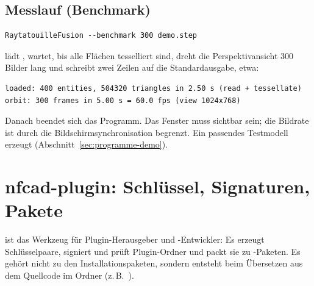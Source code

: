 \subsection{Messlauf (Benchmark)}\label{sec:programme-benchmark}

\begin{lstlisting}
RaytatouilleFusion --benchmark 300 demo.step
\end{lstlisting}

lädt , wartet, bis alle Flächen tesselliert sind, dreht die Perspektivansicht
300 Bilder lang und schreibt zwei Zeilen auf die Standardausgabe, etwa:

\begin{lstlisting}
loaded: 400 entities, 504320 triangles in 2.50 s (read + tessellate)
orbit: 300 frames in 5.00 s = 60.0 fps (view 1024x768)
\end{lstlisting}

Danach beendet sich das Programm. Das Fenster muss sichtbar sein; die Bildrate ist durch die
Bildschirmsynchronisation begrenzt. Ein passendes Testmodell erzeugt 
(Abschnitt~\ref{sec:programme-demo}).

\section{nfcad-plugin: Schlüssel, Signaturen, Pakete}\label{sec:programme-nfcad-plugin}

 ist das Werkzeug für Plugin-Herausgeber und -Entwickler: Es erzeugt
Schlüsselpaare, signiert und prüft Plugin-Ordner und packt sie zu -Paketen. Es
gehört nicht zu den Installationspaketen, sondern entsteht beim Übersetzen aus dem Quellcode im
Ordner  (z.\,B.\ ).

